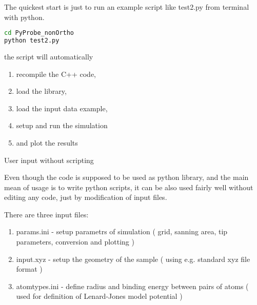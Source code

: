 The quickest start is just to run an example script like test2.py from terminal with python.
\begin{shadedbox}
    \begin{lstlisting}[language=bash]
cd PyProbe_nonOrtho
python test2.py
    \end{lstlisting}
\end{shadedbox}


the script will automatically
\begin{enumerate}
\item   recompile the C++ code,
\item   load the library,
\item   load the input data example,
\item   setup and run the simulation
\item   and plot the results
\end{enumerate}

User input without scripting

Even though the code is supposed to be used as python library, and the main mean
of usage is to write python scripts, it can be also used fairly well without
editing any code, just by modification of input files.

There are three input files:
\begin{enumerate}

    \item params.ini - setup parametrs of simulation ( grid, sanning area, tip parameters, conversion and plotting )
    \item input.xyz - setup the geometry of the sample ( using e.g. standard xyz file format )
    \item atomtypes.ini - define radius and binding energy between pairs of atoms ( used for definition of Lenard-Jones model potential )

\end{enumerate}
